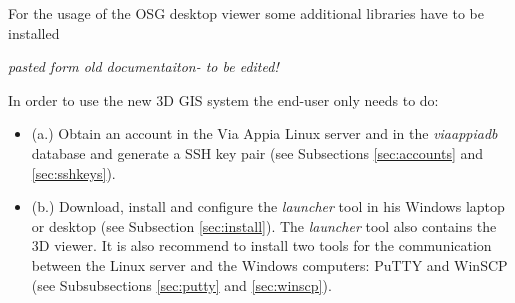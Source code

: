 For the usage of the OSG desktop viewer some additional libraries have to be installed




{\em pasted form old documentaiton- to be edited!}
 
In order to use the new 3D GIS system the end-user only needs to do:
\begin{itemize}
\item (a.) Obtain an account in the Via Appia Linux server and in the \textit{viaappiadb} database and generate a SSH key pair (see Subsections \ref{sec:accounts} and \ref{sec:sshkeys}).
\item (b.) Download, install and configure the \textit{launcher} tool in his Windows laptop or desktop (see Subsection \ref{sec:install}).  The \textit{launcher} tool also contains the 3D viewer. It is also recommend to install two tools for the communication between the Linux server and the Windows computers: PuTTY and WinSCP (see Subsubsections \ref{sec:putty} and \ref{sec:winscp}).
\end{itemize}